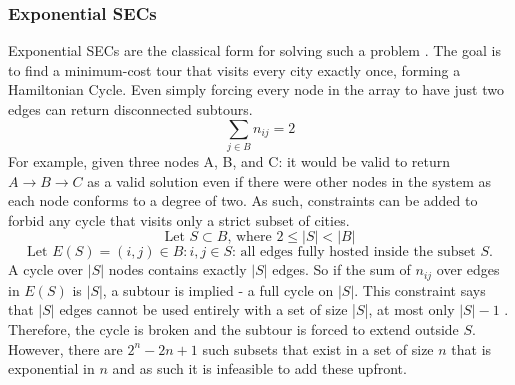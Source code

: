 \subsubsection{Exponential SECs}\label{ExpSEC}
Exponential SECs are the classical form for solving such a problem \citep{tsp_2007}. The goal is to find a minimum-cost tour that visits every city exactly once, forming a Hamiltonian Cycle. Even simply forcing every node in the array to have just two edges can return disconnected subtours.
\[
\sum_{j\in B}n_{ij} = 2
\]
For example, given three nodes A, B, and C: it would be valid to return $A\rightarrow B \rightarrow C$ as a valid solution even if there were other nodes in the system as each node conforms to a degree of two.
\newline
As such, constraints can be added to forbid any cycle that visits only a strict subset of cities.
\[\text{Let }S\subset B \text{, where }2\leq |S|<|B|\]
\[\text{Let }E(S) = {(i,j)\in B:i,j\in S}\text{: all edges fully hosted inside the subset $S$.}\]
A cycle over $|S|$ nodes contains exactly $|S|$ edges. So if the sum of $n_{ij}$ over edges in $E(S)$ is $|S|$, a subtour is implied - a full cycle on $|S|$. This constraint says that $|S|$ edges cannot be used entirely with a set of size |$S$|, at most only $|S|-1$ \citep{Petrica_2007}. Therefore, the cycle is broken and the subtour is forced to extend outside $S$.
However, there are $2^n-2n+1$ such subsets that exist in a set of size $n$ that is exponential in $n$ and as such it is infeasible to add these upfront. \citep{Pferschy_2016}

